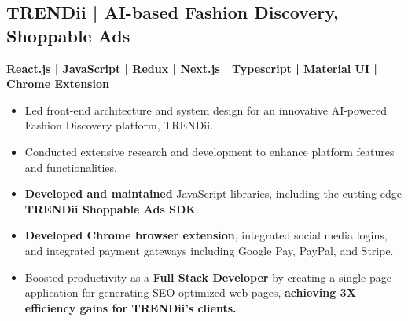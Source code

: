\documentclass[letterpaper]{deedy-resume} %
\begin{document}
\begin{minipage}[t]{0.66\textwidth}

\subsection{TRENDii\href{https://www.trendii.com/}{\texorpdfstring{\faExternalLink}{}} | AI-based Fashion Discovery, Shoppable Ads}


\textbf{React.js | JavaScript | Redux | Next.js | Typescript | Material UI | Chrome Extension} \\
\vspace{-\topsep}
\begin{itemize}
    \setlength\itemsep{-0.5em} %
    \item Led front-end architecture and system design for an innovative AI-powered Fashion Discovery platform, TRENDii.
    \item Conducted extensive research and development to enhance platform features and functionalities.
    \item \textbf{Developed and maintained} JavaScript libraries, including the cutting-edge \textbf{TRENDii Shoppable Ads SDK}.
    \item \textbf{Developed Chrome browser extension}, integrated social media logins, and integrated payment gateways including Google Pay, PayPal, and Stripe.
    \item Boosted productivity as a \textbf{Full Stack Developer} by creating a single-page application for generating SEO-optimized web pages, \textbf{achieving 3X efficiency gains for TRENDii's clients.}
\end{itemize}

\sectionspace %





\end{minipage} %


\newpage %
\end{document}
